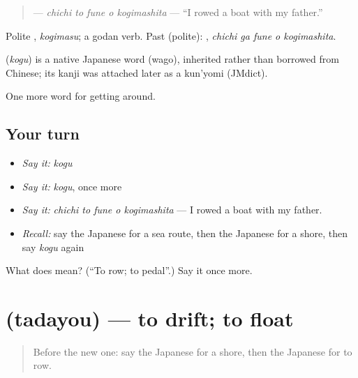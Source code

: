 \begin{quote}
\textbf{  } — \emph{chichi to fune o kogimashita} — \textquotedblleft{}I rowed a boat with my father.\textquotedblright{}
\end{quote}

Polite \textbf{}, \emph{kogimasu}; a godan verb. Past (polite): \textbf{  }, \emph{chichi ga fune o kogimashita}.

\begin{cousinweb}
\textbf{} (\emph{kogu}) is a native Japanese word (wago), inherited rather than borrowed from Chinese; its kanji was attached later as a kun'yomi (JMdict).
\end{cousinweb}

\begin{grammarlens}[title={What you've built}]
One more word for getting around.
\end{grammarlens}

\subsection*{Your turn}
\begin{itemize}
\raggedright
  \item \emph{Say it:} \emph{kogu}
  \item \emph{Say it:} \emph{kogu}, once more
  \item \emph{Say it:} \emph{chichi to fune o kogimashita} — I rowed a boat with my father.
  \item \emph{Recall:} say the Japanese for a sea route, then the Japanese for a shore, then say \emph{kogu} again
\end{itemize}

\begin{tcolorbox}[breakable,colback=teal!4,colframe=teal!35!black,title={Before you move on}]
What does  mean? (\textquotedblleft{}To row; to pedal\textquotedblright{}.) Say it once more.
\end{tcolorbox}
\section[\texorpdfstring{\ja{ただよう} (tadayou)}{ただよう (tadayou)}]{ (tadayou) — to drift; to float}

\label{lesson:JA-C381-tadayou}



\begin{quote}
Before the new one: say the Japanese for a shore, then the Japanese for to row.
\end{quote}

